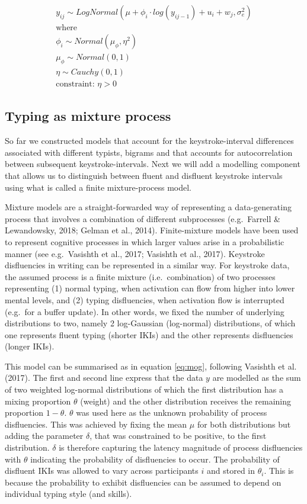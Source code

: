 \documentclass[
  english,
  man,mask,floatsintext]{apa7}
\begin{document}
\[
\tag{6}
\begin{aligned}
y_{ij} \sim LogNormal(\mu + \phi_i \cdot log(y_{ij-1}) + u_i + w_j, \sigma_e^2)\\
\text{where}\\
\phi_i \sim Normal(\mu_{\phi}, \eta^2)\\
\mu_{\phi} \sim Normal(0, 1)\\
\eta \sim Cauchy(0, 1)\\
\text{constraint: }\eta >0 
\end{aligned}
\label{eq:ark}
\]

\hypertarget{typing-as-mixture-process}{%
\subsection{Typing as mixture process}\label{typing-as-mixture-process}}

So far we constructed models that account for the keystroke-interval differences associated with different typists, bigrams and that accounts for autocorrelation between subsequent keystroke-intervals. Next we will add a modelling component that allows us to distinguish between fluent and disfluent keystroke intervals using what is called a finite mixture-process model.

Mixture models are a straight-forwarded way of representing a data-generating process that involves a combination of different subprocesses (e.g.~Farrell \& Lewandowsky, 2018; Gelman et al., 2014). Finite-mixture models have been used to represent cognitive processes in which larger values arise in a probabilistic manner (see e.g.~Vasishth et al., 2017; Vasishth et al., 2017). Keystroke disfluencies in writing can be represented in a similar way. For keystroke data, the assumed process is a finite mixture (i.e.~combination) of two processes representing (1) normal typing, when activation can flow from higher into lower mental levels, and (2) typing disfluencies, when activation flow is interrupted (e.g.~for a buffer update). In other words, we fixed the number of underlying distributions to two, namely 2 log-Gaussian (log-normal) distributions, of which one represents fluent typing (shorter IKIs) and the other represents disfluencies (longer IKIs).

This model can be summarised as in equation \ref{eq:mog}, following Vasishth et al. (2017). The first and second line express that the data \(y\) are modelled as the sum of two weighted log-normal distributions of which the first distribution has a mixing proportion \(\theta\) (weight) and the other distribution receives the remaining proportion \(1-\theta\). \(\theta\) was used here as the unknown probability of process disfluencies. This was achieved by fixing the mean \(\mu\) for both distributions but adding the parameter \(\delta\), that was constrained to be positive, to the first distribution. \(\delta\) is therefore capturing the latency magnitude of process disfluencies with \(\theta\) indicating the probability of disfluencies to occur. The probability of disfluent IKIs was allowed to vary across participants \(i\) and stored in \(\theta_i\). This is because the probability to exhibit disfluencies can be assumed to depend on individual typing style (and skills).
\end{document}
